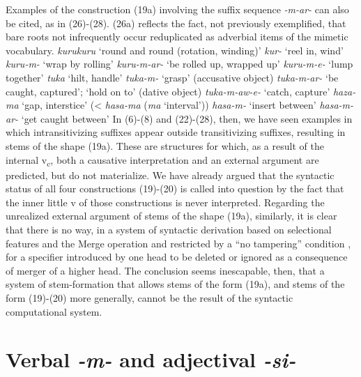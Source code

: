 \documentclass[output=paper,
modfonts
]{LSP/langsci}
\begin{document}
Examples of the construction (19a) involving the suffix sequence
\textit{-m-ar-} can also be cited, as in (26)-(28). (26a) reflects the
fact, not previously exemplified, that bare roots not infrequently occur
reduplicated as adverbial items of the mimetic vocabulary.
\ea
	 \ea \textit{kurukuru} `round and round (rotation, winding)'
	 \ex \textit{kur-} `reel in, wind'
	 \ex \textit{kuru-m-} `wrap by rolling'
	 \ex \textit{kuru-m-ar-} `be rolled up, wrapped up'
	 \ex \textit{kuru-m-e-} `lump together'
	\z
\ex 
	 \ea \textit{tuka} `hilt, handle'
	 \ex \textit{tuka-m-} `grasp' (accusative object)
	 \ex \textit{tuka-m-ar-} `be caught, captured'; `hold on to' (dative object)
	 \ex \textit{tuka-m-aw-e-} `catch, capture'
	\z
\ex
	 \ea \textit{haza-ma} `gap, interstice' (\textless{} \textit{hasa-ma} (\textit{ma} `interval'))
	 \ex \textit{hasa-m-} `insert between'
	 \ex \textit{hasa-m-ar-} `get caught between'
	\z
\z
In (6)-(8) and (22)-(28), then, we have seen examples in which
intransitivizing suffixes appear outside transitivizing suffixes,
resulting in stems of the shape (19a). These are structures for which,
as a result of the internal v\textsubscript{c}, both a causative
interpretation and an external argument are predicted, but do not
materialize. We have already argued that the syntactic status of all
four constructions (19)-(20) is called into question by the fact that
the inner little v of those constructions is never interpreted.
Regarding the unrealized external argument of stems of the shape (19a),
similarly, it is clear that there is no way, in a system of syntactic
derivation based on selectional features and the Merge operation and
restricted by a ``no tampering'' condition \citep[138]{chomsky2008a}, for a
specifier introduced by one head to be deleted or ignored as a
consequence of merger of a higher head. The conclusion seems
inescapable, then, that a system of stem-formation that allows stems of
the form (19a), and stems of the form (19)-(20) more generally, cannot
be the result of the syntactic computational system.

\section{Verbal \textit{-m-} and adjectival \textit{-si-}}\label{verbal}
\end{document}
